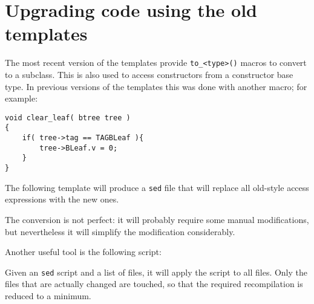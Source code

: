 \chapter{Upgrading code using the old {\C} templates}
\label{s.upgrade}
The most recent version of the {\Tm} templates provide
\verb'to_<type>()' macros to convert to a subclass. This is also
used to access constructors from a constructor base type.
In previous versions of the {\Tm} templates this was done with
another macro; for example:
\begin{showfile}
\begin{verbatim}
void clear_leaf( btree tree )
{
    if( tree->tag == TAGBLeaf ){
        tree->BLeaf.v = 0;
    }
}
\end{verbatim}
\end{showfile}
The following {\Tm} template will produce a \texttt{sed} file that
will replace all old-style access expressions with the new ones.
\begin{showfile}
\end{showfile}
The conversion is not perfect: it will probably require some manual
modifications, but nevertheless it will simplify the modification
considerably.
\par
Another useful tool is the following script:
\begin{showfile}
\end{showfile}
Given an \texttt{sed} script and a list of files, it will apply the
script to all files. Only the files that are actually changed are
touched, so that the required recompilation is reduced to a minimum.
